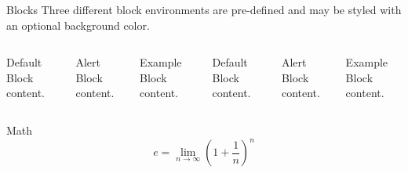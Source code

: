 \begin{frame}{Blocks}
  Three different block environments are pre-defined and may be styled with an
  optional background color.

  \begin{columns}[T,onlytextwidth]
      \begin{block}{Default}
        Block content.
      \end{block}

      \begin{alertblock}{Alert}
        Block content.
      \end{alertblock}

      \begin{exampleblock}{Example}
        Block content.
      \end{exampleblock}



      \begin{block}{Default}
        Block content.
      \end{block}

      \begin{alertblock}{Alert}
        Block content.
      \end{alertblock}

      \begin{exampleblock}{Example}
        Block content.
      \end{exampleblock}

  \end{columns}
\end{frame}
\begin{frame}{Math}
  \begin{equation*}
    e = \lim_{n\to \infty} \left(1 + \frac{1}{n}\right)^n
  \end{equation*}
\end{frame}

